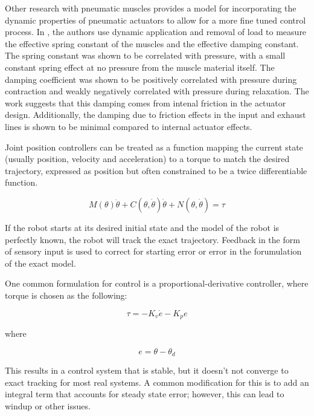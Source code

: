 Other research with pneumatic muscles provides a model for incorporating the
dynamic properties of pneumatic actuators to allow for a more fine tuned control
process. In \cite{DynamicPMuscles}, the authors use dynamic application and
removal of load to measure the effective spring constant of the muscles and the
effective damping constant. The spring constant was shown to be correlated with
pressure, with a small constant spring effect at no pressure from the muscle
material itself. The damping coefficient was shown to be positively correlated
with pressure during contraction and weakly negatively correlated with pressure
during relaxation. The work suggests that this damping comes from intenal
friction in the actuator design. Additionally, the damping due to friction
effects in the input and exhaust lines is shown to be minimal compared to
internal actuator effects. \cite{DynamicPMuscles}

\cite{einstein}


Joint position controllers can be treated as a function mapping the current
state (usually position, velocity and acceleration) to a torque to match the 
desired trajectory, expressed as position but often constrained to be a twice
differentiable function.

\begin{equation}
M(\theta) \ddot{\theta} + C(\theta, \dot{\theta}) \dot{\theta} + N(\theta, \dot{\theta}) = \tau
\end{equation}

If the robot starts at its desired initial state and the model of the robot is
perfectly known, the robot will track the exact trajectory. Feedback in the 
form of sensory input is used to correct for starting error or error in the 
forumulation of the exact model.

One common formulation for control is a proportional-derivative controller, 
where torque is chosen as the following:

\begin{equation}
\tau = -K_{v} \dot{e} - K_{p} e
\end{equation}

where

\begin{equation}
e = \theta - \theta_{d}
\end{equation}

This results in a control system that is stable, but it doesn't not converge to
exact tracking for most real systems. A common modification for this is to add
an integral term that accounts for steady state error; however, this can lead to
windup or other issues.

